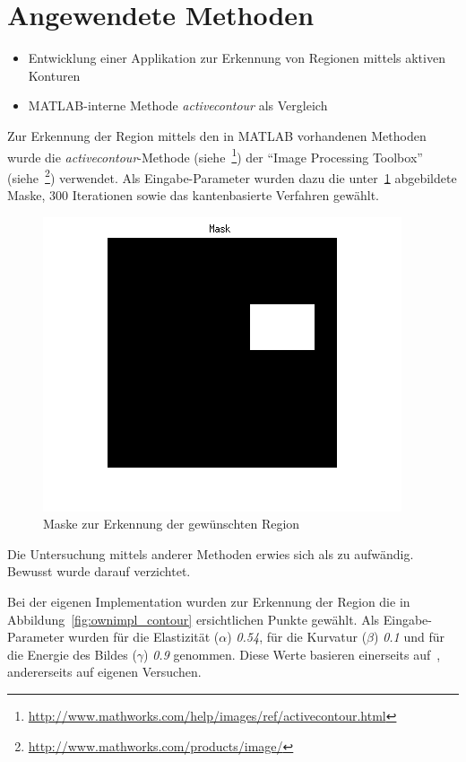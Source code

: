 \newpage

\section{Angewendete Methoden}
\label{sec:proceeding:methods}
\begin{itemize}
    \item Entwicklung einer Applikation zur Erkennung von Regionen mittels aktiven Konturen
    \item MATLAB-interne Methode \textit{activecontour} als Vergleich
\end{itemize}

Zur Erkennung der Region mittels den in MATLAB vorhandenen Methoden wurde die \textit{activecontour}-Methode (siehe~\footnote{\url{http://www.mathworks.com/help/images/ref/activecontour.html}}) der ``Image Processing Toolbox'' (siehe~\footnote{\url{http://www.mathworks.com/products/image/}}) verwendet. Als Eingabe-Parameter wurden dazu die unter~\ref{fig:matlab_mask} abgebildete Maske, 300 Iterationen sowie das kantenbasierte Verfahren gewählt.

\begin{figure}[h!]
    \centering
    \includegraphics[scale=0.5]{images/matlab_mask.png}
    \caption{Maske zur Erkennung der gewünschten Region\protect\footnotemark[4]{}}
\label{fig:matlab_mask}
\end{figure}

Die Untersuchung mittels anderer Methoden erwies sich als zu aufwändig. Bewusst wurde darauf verzichtet.

Bei der eigenen Implementation wurden zur Erkennung der Region die in Abbildung~\ref{fig:ownimpl_contour} ersichtlichen Punkte gewählt. Als Eingabe-Parameter wurden für die Elastizität ($\alpha$) \textit{0.54}, für die Kurvatur ($\beta$) \textit{0.1} und für die Energie des Bildes ($\gamma$) \textit{0.9} genommen. Diese Werte basieren einerseits auf~\cite[Seite 148]{hudritsch:script:cp}, andererseits auf eigenen Versuchen.

